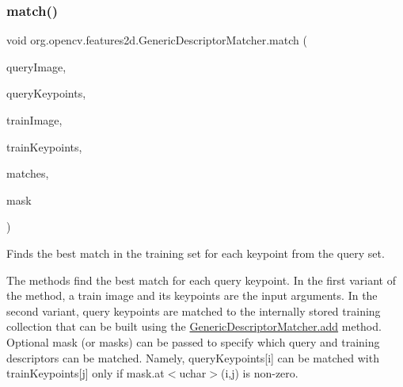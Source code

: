 \subsubsection{\texorpdfstring{match()}{match()}\hspace{0.1cm}{\footnotesize\ttfamily [1/4]}}
{\footnotesize\ttfamily void org.\+opencv.\+features2d.\+Generic\+Descriptor\+Matcher.\+match (\begin{DoxyParamCaption}\item[{\mbox{\hyperlink{classorg_1_1opencv_1_1core_1_1_mat}{Mat}}}]{query\+Image,  }\item[{\mbox{\hyperlink{classorg_1_1opencv_1_1core_1_1_mat_of_key_point}{Mat\+Of\+Key\+Point}}}]{query\+Keypoints,  }\item[{\mbox{\hyperlink{classorg_1_1opencv_1_1core_1_1_mat}{Mat}}}]{train\+Image,  }\item[{\mbox{\hyperlink{classorg_1_1opencv_1_1core_1_1_mat_of_key_point}{Mat\+Of\+Key\+Point}}}]{train\+Keypoints,  }\item[{\mbox{\hyperlink{classorg_1_1opencv_1_1core_1_1_mat_of_d_match}{Mat\+Of\+D\+Match}}}]{matches,  }\item[{\mbox{\hyperlink{classorg_1_1opencv_1_1core_1_1_mat}{Mat}}}]{mask }\end{DoxyParamCaption})}

Finds the best match in the training set for each keypoint from the query set.

The methods find the best match for each query keypoint. In the first variant of the method, a train image and its keypoints are the input arguments. In the second variant, query keypoints are matched to the internally stored training collection that can be built using the {\ttfamily \mbox{\hyperlink{classorg_1_1opencv_1_1features2d_1_1_generic_descriptor_matcher_ad0e0a234636c370c74fdd4086ac5c716}{Generic\+Descriptor\+Matcher.\+add}}} method. Optional mask (or masks) can be passed to specify which query and training descriptors can be matched. Namely, {\ttfamily query\+Keypoints\mbox{[}i\mbox{]}} can be matched with {\ttfamily train\+Keypoints\mbox{[}j\mbox{]}} only if {\ttfamily mask.\+at$<$uchar$>$(i,j)} is non-\/zero.


